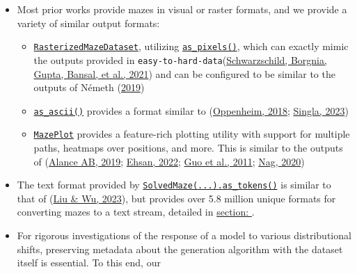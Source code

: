 \documentclass[10pt,a4paper,onecolumn]{article}
\providecommand{\tightlist}{%
  \setlength{\itemsep}{0pt}\setlength{\parskip}{0pt}}
\begin{document}
\begin{itemize}
\item
  Most prior works provide mazes in visual or raster formats, and we
  provide a variety of similar output formats:

  \begin{itemize}
  \tightlist
  \item
    \href{https://understanding-search.github.io/maze-dataset/maze_dataset/dataset/rasterized.html\#RasterizedMazeDataset}{\texttt{RasterizedMazeDataset}},
    utilizing
    \href{https://understanding-search.github.io/maze-dataset/maze_dataset.html\#LatticeMaze.as_pixels}{\texttt{as\_pixels()}},
    which can exactly mimic the outputs provided in
    \texttt{easy-to-hard-data}(\protect\hyperlink{ref-easy_to_hard}{Schwarzschild,
    Borgnia, Gupta, Bansal, et al., 2021}) and can be configured to be
    similar to the outputs of Németh
    (\protect\hyperlink{ref-gh_Nemeth_2019}{2019})
  \item
    \href{https://understanding-search.github.io/maze-dataset/maze_dataset.html\#LatticeMaze.as_ascii}{\texttt{as\_ascii()}}
    provides a format similar to
    (\protect\hyperlink{ref-gh-oppenheimj2018maze}{Oppenheim, 2018};
    \protect\hyperlink{ref-eval-gpt-visual}{Singla, 2023})
  \item
    \href{https://understanding-search.github.io/maze-dataset/maze_dataset/plotting.html\#MazePlot}{\texttt{MazePlot}}
    provides a feature-rich plotting utility with support for multiple
    paths, heatmaps over positions, and more. This is similar to the
    outputs of (\protect\hyperlink{ref-mazegenerator-net}{Alance AB,
    2019}; \protect\hyperlink{ref-gh_Ehsan_2022}{Ehsan, 2022};
    \protect\hyperlink{ref-mathematica-maze}{Guo et al., 2011};
    \protect\hyperlink{ref-mdl-suite}{Nag, 2020})
  \end{itemize}
\item
  The text format provided by
  \href{https://understanding-search.github.io/maze-dataset/maze_dataset.html\#MazeDataset.as_tokens}{\texttt{SolvedMaze(...).as\_tokens()}}
  is similar to that of (\protect\hyperlink{ref-eval-LLM-graphs}{Liu \&
  Wu, 2023}), but provides over 5.8 million unique formats for
  converting mazes to a text stream, detailed in
  \hyperref[sec:tokenized-output-formats]{section: \textit{}}.
\item
  For rigorous investigations of the response of a model to various
  distributional shifts, preserving metadata about the generation
  algorithm with the dataset itself is essential. To this end, our

\end{itemize}
\end{document}
